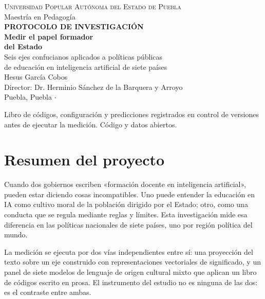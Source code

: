 \documentclass[12pt,letterpaper]{article}
\begin{document}
\begin{titlepage}
\centering
\vspace*{2cm}

{\large\scshape Universidad Popular Autónoma del Estado de Puebla}\\[0.3cm]
{\normalsize Maestría en Pedagogía}\\[2.5cm]

{\large\bfseries PROTOCOLO DE INVESTIGACIÓN}\\[1.5cm]

{\LARGE\bfseries Medir el papel formador\\del Estado}\\[0.8cm]
{\large Seis ejes confucianos aplicados a políticas públicas\\de educación en inteligencia artificial de siete países}\\[3cm]

{\large Hesus García Cobos}\\[0.5cm]
{\normalsize Director: Dr. Herminio Sánchez de la Barquera y Arroyo}\\[3cm]

{\normalsize Puebla, Puebla \quad$\cdot$}

\vfill
{\footnotesize
Libro de códigos, configuración y predicciones registrados en control de versiones\\
antes de ejecutar la medición. Código y datos abiertos.}
\end{titlepage}

\tableofcontents
\newpage


\section{Resumen del proyecto}

Cuando dos gobiernos escriben «formación docente en inteligencia artificial», pueden estar diciendo cosas incompatibles. Uno puede entender la educación en IA como cultivo moral de la población dirigido por el Estado; otro, como una conducta que se regula mediante reglas y límites. Esta investigación mide esa diferencia en las políticas nacionales de siete países, uno por región política del mundo.

La medición se ejecuta por dos vías independientes entre sí: una proyección del texto sobre un eje construido con representaciones vectoriales de significado, y un panel de siete modelos de lenguaje de origen cultural mixto que aplican un libro de códigos escrito en prosa. El instrumento del estudio no es ninguna de las dos: es el contraste entre ambas.
\end{document}
